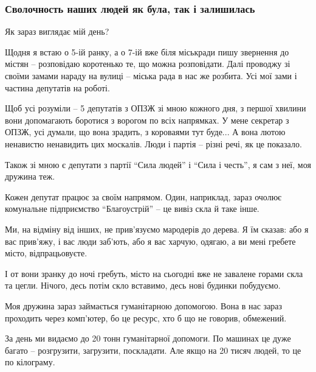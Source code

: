  
 
 
 
 
\subsubsection{Сволочность наших людей як була, так і залишилась}
\label{sec:30_03_2022.stz.news.ua.pravda.2.ohtyrka.5.svolochnost}

Як зараз виглядає мій день?

Щодня я встаю о 5-ій ранку, а о 7-ій вже біля міськради пишу звернення до
містян – розповідаю коротенько те, що можна розповідати. Далі проводжу зі
своїми замами нараду на вулиці – міська рада в нас же розбита. Усі мої зами і
частина депутатів на роботі. 

Щоб усі розуміли – 5 депутатів з ОПЗЖ зі мною кожного дня, з першої хвилини
вони допомагають боротися з ворогом по всіх напрямках. У мене секретар з ОПЗЖ,
усі думали, що вона зрадить, з короваями тут буде... А вона лютою ненавистю
ненавидить цих москалів. Люди і партія – різні речі, як це показало. 

Також зі мною є депутати з партії \enquote{Сила людей} і \enquote{Сила і честь}, я сам з неї,
моя дружина теж.

Кожен депутат працює за своїм напрямом. Один, наприклад, зараз очолює
комунальне підприємство \enquote{Благоустрій} – це вивіз скла й таке інше. 

Ми, на відміну від інших, не прив'язуємо мародерів до дерева. Я їм сказав: або
я вас прив'яжу, і вас люди заб'ють, або я вас харчую, одягаю, а ви мені гребете
місто, відпрацьовуєте.

І от вони зранку до ночі гребуть, місто на сьогодні вже не завалене горами скла
та цегли. Нічого, десь потім скло вставимо, десь нові будинки побудуємо.

Моя дружина зараз займається гуманітарною допомогою. Вона в нас зараз проходить
через комп'ютер, бо це ресурс, хто б що не говорив, обмежений.

За день ми видаємо до 20 тонн гуманітарної допомоги. По машинах це дуже багато
– розгрузити, загрузити, поскладати. Але якщо на 20 тисяч людей, то це по
кілограму. 

